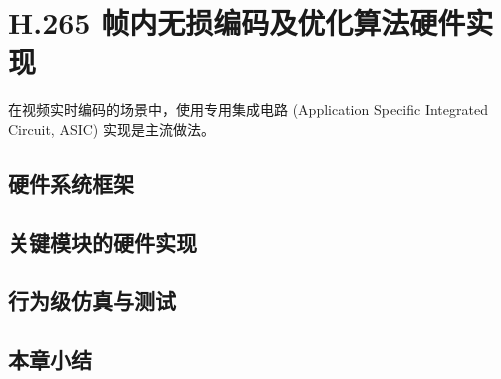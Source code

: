 \chapter{H.265 帧内无损编码及优化算法硬件实现}
\label{cha:c4}
在视频实时编码的场景中，使用专用集成电路 (Application Specific Integrated Circuit, ASIC) 实现是主流做法。

\section{硬件系统框架}

\section{关键模块的硬件实现}

\section{行为级仿真与测试}

\section{本章小结}